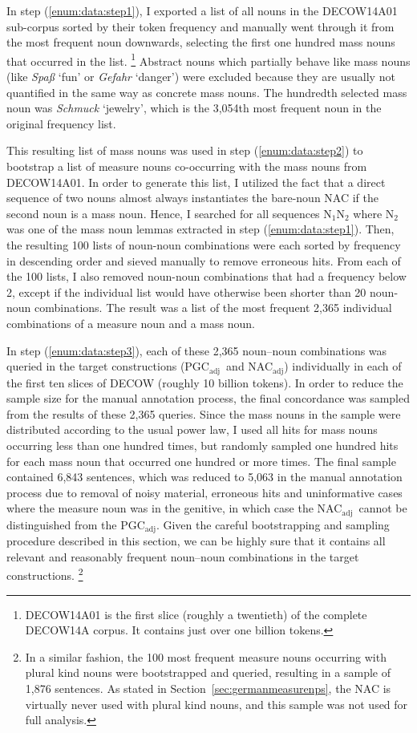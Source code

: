 \documentclass[USenglish]{article}
\newcommand{\Sub}[1]{\ensuremath{\mathrm{_{#1}}}}
\newcommand{\NACa}{NAC\Sub{adj}}
\newcommand{\PGCa}{PGC\Sub{adj}}
\begin{document}
\vspace{-1\baselineskip}

In step (\ref{enum:data:step1}), I exported a list of all nouns in the DECOW14A01 sub-corpus sorted by their token frequency and manually went through it from the most frequent noun downwards, selecting the first one hundred mass nouns that occurred in the list.%
\footnote{DECOW14A01 is the first slice (roughly a twentieth) of the complete DECOW14A corpus.
It contains just over one billion tokens.}
Abstract nouns which partially behave like mass nouns (like \textit{Spaß} `fun’ or \textit{Gefahr} `danger’) were excluded because they are usually not quantified in the same way as concrete mass nouns.
The hundredth selected mass noun was \textit{Schmuck} `jewelry’, which is the 3,054th most frequent noun in the original frequency list.

This resulting list of mass nouns was used in step (\ref{enum:data:step2}) to bootstrap a list of measure nouns co-occurring with the mass nouns from DECOW14A01.
In order to generate this list, I utilized the fact that a direct sequence of two nouns almost always instantiates the bare-noun NAC if the second noun is a mass noun.
Hence, I searched for all sequences N\Sub{1}N\Sub{2} where N\Sub{2} was one of the mass noun lemmas extracted in step (\ref{enum:data:step1}).
Then, the resulting 100 lists of noun-noun combinations were each sorted by frequency in descending order and sieved manually to remove erroneous hits.
From each of the 100 lists, I also removed noun-noun combinations that had a frequency below 2, except if the individual list would have otherwise been shorter than 20 noun-noun combinations.
The result was a list of the most frequent 2,365 individual combinations of a measure noun and a mass noun.

In step (\ref{enum:data:step3}), each of these 2,365 noun–noun combinations was queried in the target constructions (\PGCa\ and \NACa) individually in each of the first ten slices of DECOW (roughly 10 billion tokens).
In order to reduce the sample size for the manual annotation process, the final concordance was sampled from the results of these 2,365 queries.
Since the mass nouns in the sample were distributed according to the usual power law, I used all hits for mass nouns occurring less than one hundred times, but randomly sampled one hundred hits for each mass noun that occurred one hundred or more times.
The final sample contained 6,843 sentences, which was reduced to 5,063 in the manual annotation process due to removal of noisy material, erroneous hits and uninformative cases where the measure noun was in the genitive, in which case the \NACa\ cannot be distinguished from the \PGCa.
Given the careful bootstrapping and sampling procedure described in this section, we can be highly sure that it contains all relevant and reasonably frequent noun–noun combinations in the target constructions.%
\footnote{In a similar fashion, the 100 most frequent measure nouns occurring with plural kind nouns were bootstrapped and queried, resulting in a sample of 1,876 sentences.
As stated in Section~\ref{sec:germanmeasurenps}, the NAC is virtually never used with plural kind nouns, and this sample was not used for full analysis.
}
\end{document}
